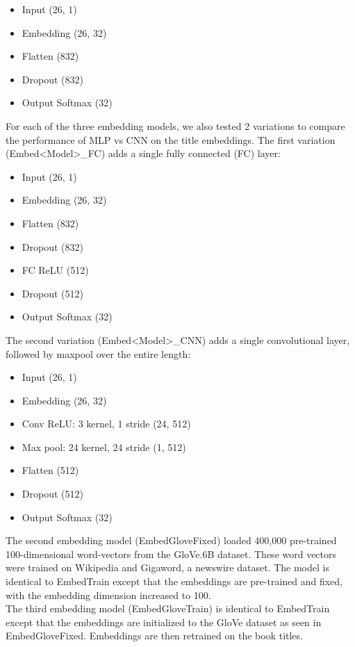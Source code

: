 \documentclass[jou,apacite, 10px]{apa6}
\begin{document}
\begin{itemize}
    \item Input (26, 1)
    \item Embedding (26, 32)
    \item Flatten (832)
    \item Dropout (832)
    \item Output Softmax (32)
\end{itemize}
For each of the three embedding models, we also tested 2 variations to compare the performance of MLP vs CNN on the title embeddings. The first variation (Embed<Model>\_FC) adds a single fully connected (FC) layer:\\
\begin{itemize}
    \item Input (26, 1)
    \item Embedding (26, 32)
    \item Flatten (832)
    \item Dropout (832)
    \item FC ReLU (512)
    \item Dropout (512)
    \item Output Softmax (32)
\end{itemize}\rule{0pt}{4ex}
The second variation (Embed<Model>\_CNN) adds a single convolutional layer, followed by maxpool over the entire length:

\begin{itemize}
    \item Input (26, 1)
    \item Embedding (26, 32)
    \item Conv ReLU: 3 kernel, 1 stride (24, 512)
    \item Max pool: 24 kernel, 24 stride (1, 512)
    \item Flatten (512)
    \item Dropout (512)
    \item Output Softmax (32)
\end{itemize}
The second embedding model (EmbedGloveFixed) loaded 400,000 pre-trained 100-dimensional word-vectors from the GloVe.6B dataset. These word vectors were trained on Wikipedia and Gigaword, a newswire dataset. The model is identical to EmbedTrain except that the embeddings are pre-trained and fixed, with the embedding dimension increased to 100.\\
The third embedding model (EmbedGloveTrain) is identical to EmbedTrain except that the embeddings are initialized to the GloVe dataset as seen in EmbedGloveFixed. Embeddings are then retrained on the book titles.
\end{document}
